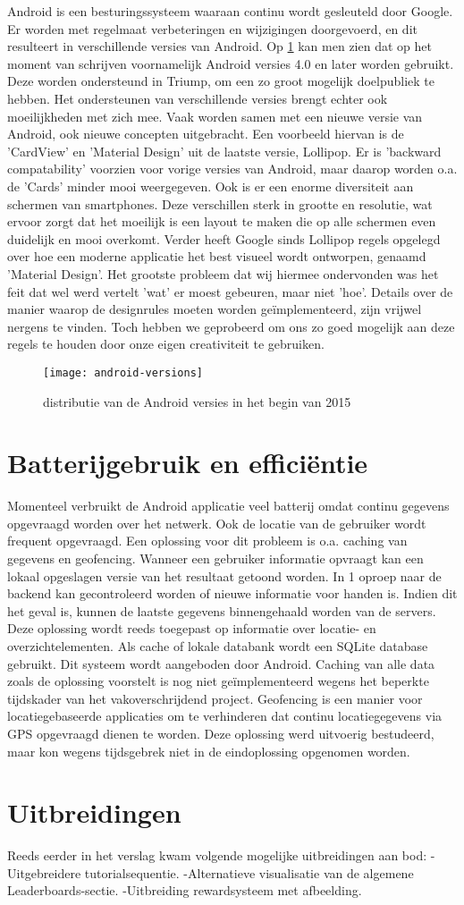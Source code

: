 Android is een besturingssysteem waaraan continu wordt gesleuteld door Google. Er worden met regelmaat verbeteringen en wijzigingen doorgevoerd, en dit resulteert in verschillende versies van Android.
Op \ref{fig:android_versions} kan men zien dat op het moment van schrijven voornamelijk Android versies 4.0 en later worden gebruikt. Deze worden ondersteund in Triump, om een zo groot mogelijk doelpubliek te hebben. Het ondersteunen van verschillende versies brengt echter ook moeilijkheden met zich mee. Vaak worden samen met een nieuwe versie van Android, ook nieuwe concepten uitgebracht.
Een voorbeeld hiervan is de 'CardView' en 'Material Design' uit de laatste versie, Lollipop. Er is 'backward compatability' voorzien voor vorige versies van Android, maar daarop worden o.a. de 'Cards' minder mooi weergegeven.
Ook is er een enorme diversiteit aan schermen van smartphones. Deze verschillen sterk in grootte en resolutie, wat ervoor zorgt dat het moeilijk is een layout te maken die op alle schermen even duidelijk en mooi overkomt.
Verder heeft Google sinds Lollipop regels opgelegd over hoe een moderne applicatie het best visueel wordt ontworpen, genaamd 'Material Design'. Het grootste probleem dat wij hiermee ondervonden was het feit dat wel werd vertelt 'wat' er moest gebeuren, maar niet 'hoe'. Details over de manier waarop de designrules moeten worden geïmplementeerd, zijn vrijwel nergens te vinden. Toch hebben we geprobeerd om ons zo goed mogelijk aan deze regels te houden door onze eigen creativiteit te gebruiken.
\begin{figure}[H]
	\centering
	\texttt{[image: android-versions]}
	\caption{distributie van de Android versies in het begin van 2015}
	\label{fig:android_versions}
\end{figure}

\section{Batterijgebruik en efficiëntie}
Momenteel verbruikt de Android applicatie veel batterij omdat continu gegevens opgevraagd worden over het netwerk. Ook de locatie van de gebruiker wordt frequent opgevraagd.
Een oplossing voor dit probleem is o.a. caching van gegevens en geofencing. Wanneer een gebruiker informatie opvraagt kan een lokaal opgeslagen versie van het resultaat getoond worden. In 1 oproep naar de backend kan gecontroleerd worden of nieuwe informatie voor handen is. Indien dit het geval is, kunnen de laatste gegevens binnengehaald worden van de servers. Deze oplossing wordt reeds toegepast op informatie over locatie- en overzichtelementen. Als cache of lokale databank wordt een SQLite database gebruikt. Dit systeem wordt aangeboden door Android. Caching van alle data zoals de oplossing voorstelt is nog niet geïmplementeerd wegens het beperkte tijdskader van het vakoverschrijdend project.
Geofencing is een manier voor locatiegebaseerde applicaties om te verhinderen dat continu locatiegegevens via GPS opgevraagd dienen te worden. Deze oplossing werd uitvoerig bestudeerd, maar kon wegens tijdsgebrek niet in de eindoplossing opgenomen worden.
\section{Uitbreidingen}
Reeds eerder in het verslag kwam volgende mogelijke uitbreidingen aan bod:
-Uitgebreidere tutorialsequentie.
-Alternatieve visualisatie van de algemene Leaderboards-sectie.
-Uitbreiding rewardsysteem met afbeelding.




